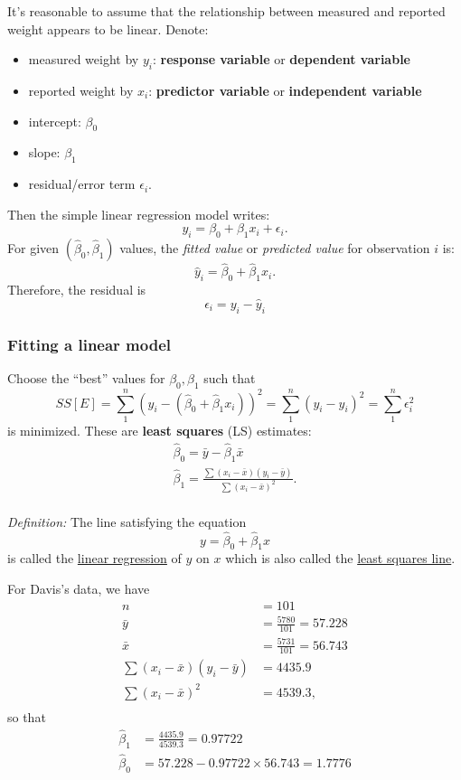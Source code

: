 It's reasonable to assume that the relationship between measured and reported weight appears to be linear.
Denote:
\begin{itemize}
  \item measured weight by $y_i$: {\bf response variable} or {\bf dependent variable}
  \item reported weight by $x_i$: {\bf predictor variable} or {\bf independent variable}
  \item intercept: $\beta_0$ %
  \item slope: $\beta_1$
  \item residual/error term $\epsilon_i$.
\end{itemize}
%
Then the simple linear regression model writes:
$$
y_i = \beta_0 + \beta_1 x_i + \epsilon_i.
$$
For given $(\hat{\beta}_0, \hat{\beta}_1)$ values, the {\it fitted value} or {\it predicted value} for observation $i$ is:
$$
\hat{y}_i = \hat{\beta}_0 + \hat{\beta}_1 x_i.
$$
%
Therefore, the residual is
$$
\epsilon_i = y_i - \hat{y}_i 
$$

\subsubsection*{Fitting a linear model}

Choose the ``best'' values for $\beta_0, \beta_1$ such that 
$$
SS[E] = \sum\limits_{1}^{n}\left( y_i - (\hat{\beta}_0 + \hat{\beta}_1 x_i) \right)^2 = \sum\limits_{1}^{n}(y_i - \hat{y}_i)^2 = \sum\limits_{1}^{n}\epsilon_i^2
$$
is minimized.
These are {\bf least squares} (LS) estimates:
$$
\begin{array}{l}
\hat{\beta}_0 = \bar{y} - \hat{\beta}_1 \bar{x}\\
\hat{\beta}_1 = \frac{\sum(x_i - \bar{x})(y_i - \bar{y})}{\sum(x_i - \bar{x})^2}.\\
\end{array}
$$

{\it Definition: } The line satisfying the equation
$$
y = \hat{\beta}_0 + \hat{\beta}_1 x
$$
is called the \underline{linear regression} of $y$ on $x$ which is also called the \underline{least squares line}.

For Davis's data, we have
\begin{equation*}
\begin{aligned}
n &= 101 \\
\bar{y} &= \frac{5780}{101} = 57.228\\
\bar{x} &= \frac{5731}{101} = 56.743\\
\sum(x_i - \bar{x})(y_i - \bar{y}) &= 4435.9\\
\sum(x_i - \bar{x})^2 &= 4539.3,\\
\end{aligned}
\end{equation*}
so that
\begin{equation*}
\begin{aligned}
\hat{\beta}_1 &= \frac{4435.9}{4539.3} = 0.97722\\
\hat{\beta}_0 &= 57.228 - 0.97722 \times 56.743 = 1.7776\\
\end{aligned}
\end{equation*}
